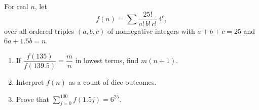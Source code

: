 For real $n$, let
\[f(n)=\sum\dfrac{25!}{a!\,b!\,c!}\,4^c,\]
over all ordered triples $(a,b,c)$ of nonnegative integers with $a+b+c=25$ and $6a+1.5b=n$.
\begin{enumerate}
\item[(a)] If $\dfrac{f(135)}{f(139.5)}=\dfrac mn$ in lowest terms, find $m(n+1)$.
\item[(b)] Interpret $f(n)$ as a count of dice outcomes.
\item[(c)] Prove that $\displaystyle\sum_{j=0}^{100}f(1.5j)=6^{25}$.
\end{enumerate}
